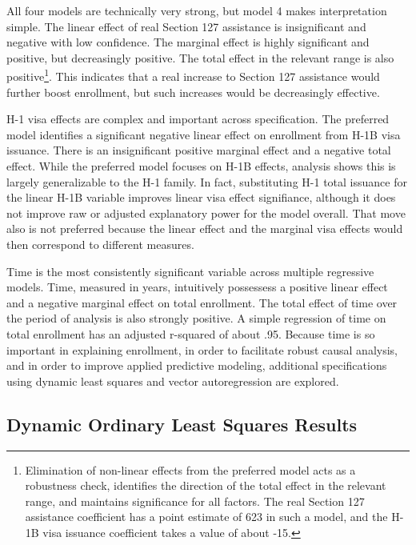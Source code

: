 \documentclass[review]{elsarticle}
\begin{document}
All four models are technically very strong,
but model 4 makes interpretation simple.
The linear effect of real Section 127 assistance is insignificant and negative with low confidence.
The marginal effect is highly significant and positive, but decreasingly positive.
The total effect in the relevant range is also positive\footnote{
    Elimination of non-linear effects from the preferred model acts as a robustness check,
    identifies the direction of the total effect in the relevant range,
    and maintains significance for all factors.
    The real Section 127 assistance coefficient has a point estimate of 623 in such a model,
    and the H-1B visa issuance coefficient takes a value of about -15.
}.
This indicates that a real increase to Section 127 assistance would further boost enrollment,
but such increases would be decreasingly effective.

H-1 visa effects are complex and important across specification.
The preferred model identifies a significant negative linear effect on enrollment
from H-1B visa issuance.
There is an insignificant positive marginal effect and a negative total effect.
While the preferred model focuses on H-1B effects, analysis shows this is largely
generalizable to the H-1 family.
In fact, substituting H-1 total issuance for the linear H-1B variable improves
linear visa effect signifiance,
although it does not improve raw or adjusted explanatory power for the model overall.
That move also is not preferred because the linear effect and the marginal visa effects would then correspond to different measures.

Time is the most consistently significant variable across multiple regressive models.
Time, measured in years, intuitively possessess a positive linear effect and a negative marginal effect on total enrollment.
The total effect of time over the period of analysis is also strongly positive.
A simple regression of time on total enrollment has an adjusted r-squared of about .95.
Because time is so important in explaining enrollment,
in order to facilitate robust causal analysis,
and in order to improve applied predictive modeling,
additional specifications using dynamic least squares and vector autoregression
are explored.

\subsection{Dynamic Ordinary Least Squares Results}
\end{document}

